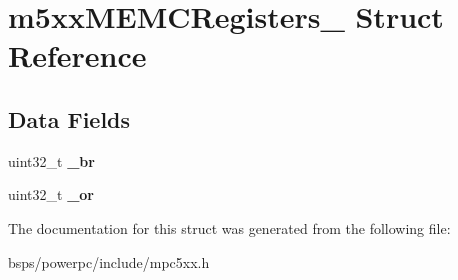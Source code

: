 \hypertarget{structm5xxMEMCRegisters__}{}\section{m5xx\+M\+E\+M\+C\+Registers\+\_\+ Struct Reference}
\label{structm5xxMEMCRegisters__}
\subsection*{Data Fields}
\begin{DoxyCompactItemize}
\item 
\mbox{\label{structm5xxMEMCRegisters___a8c0d8b85785cfbe6ef4f682413835aa1}} 
uint32\+\_\+t {\bfseries \+\_\+br}
\item 
\mbox{\label{structm5xxMEMCRegisters___a7fc27162c3db742aa7d64fff16cc1798}} 
uint32\+\_\+t {\bfseries \+\_\+or}
\end{DoxyCompactItemize}


The documentation for this struct was generated from the following file\+:\begin{DoxyCompactItemize}
\item 
bsps/powerpc/include/mpc5xx.\+h\end{DoxyCompactItemize}
